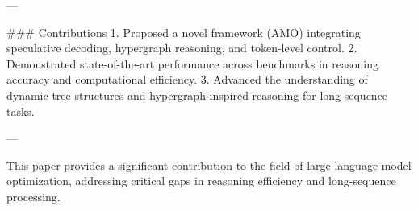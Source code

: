 ---

### Contributions  
1. Proposed a novel framework (AMO) integrating speculative decoding, hypergraph reasoning, and token-level control.
2. Demonstrated state-of-the-art performance across benchmarks in reasoning accuracy and computational efficiency.
3. Advanced the understanding of dynamic tree structures and hypergraph-inspired reasoning for long-sequence tasks.

--- 

This paper provides a significant contribution to the field of large language model optimization, addressing critical gaps in reasoning efficiency and long-sequence processing.
